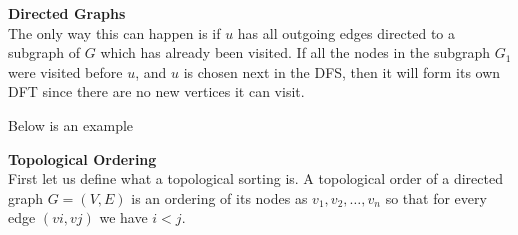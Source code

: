 \documentclass[11pt]{article}
\begin{document}
\begin{solution} \textbf{Directed Graphs}\\

The only way this can happen is if $u$ has all outgoing edges directed to a subgraph of $G$ which has already been visited. If all the nodes in the subgraph $G_1$ were visited before $u$, and $u$ is chosen next in the DFS, then it will form its own DFT since there are no new vertices it can visit. 


\hfil


Below is an example

\hfil


\begin{center}

\end{center}

	
\end{solution}



\begin{solution} \textbf{Topological Ordering} \\

	First let us define what a topological sorting is. A topological order of a directed graph $G = (V, E)$ is an ordering of its nodes as $v_1, v_2, …, v_n$ so that for every edge $(vi, vj)$ we have $i < j$.
	
\end{solution}
\end{document}

